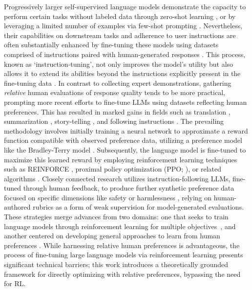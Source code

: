 Progressively larger self-supervised language models demonstrate the capacity to perform certain tasks without labeled data through zero-shot learning \citep{radford2019language}, or by leveraging a limited number of examples via few-shot prompting \citep{gpt3,megatron,chowdhery2022palm}. Nevertheless, their capabilities on downstream tasks and adherence to user instructions are often substantially enhanced by fine-tuning these models using datasets comprised of instructions paired with human-generated responses \citep{mishra-etal-2022-cross,sanh2022multitask,chung2022scaling,thoppilan2022lamda}. This process, known as `instruction-tuning', not only improves the model's utility but also allows it to extend its abilities beyond the instructions explicitly present in the fine-tuning data \citep{chung2022scaling}. In contrast to collecting expert demonstrations, gathering \textit{relative} human evaluations of response quality tends to be more practical, prompting more recent efforts to fine-tune LLMs using datasets reflecting human preferences. This has resulted in marked gains in fields such as translation \citep{kreutzer-etal-2018-reliability}, summarization \citep{stiennon2022learning,ziegler2020finetuning}, story-telling \citep{ziegler2020finetuning}, and following instructions \citep{ouyang2022training,ramamurthy2023is}. The prevailing methodology involves initially training a neural network to approximate a reward function compatible with observed preference data, utilizing a preference model like the Bradley-Terry model \citep{bradley1952rankanalysis}. Subsequently, the language model is fine-tuned to maximize this learned reward by employing reinforcement learning techniques such as REINFORCE \citep{williams1992reinforce}, proximal policy optimization (PPO; \cite{schulman2017proximal}), or related algorithms \citep{ramamurthy2023is}. Closely connected research utilizes instruction-following LLMs, fine-tuned through human feedback, to produce further synthetic preference data focused on specific dimensions like safety or harmlessness \citep{bai2022constitutional}, relying on human-authored rubrics as a form of weak supervision for model-generated evaluations. These strategies merge advances from two domains: one that seeks to train language models through reinforcement learning for multiple objectives~\citep{Ranzato2015SequenceLT,paulus2018a,wu2018learning}, and another centered on developing general approaches to learn from human preferences \citep{christiano2017deep,kupcsik2018learning}. While harnessing relative human preferences is advantageous, the process of fine-tuning large language models via reinforcement learning presents significant technical barriers; this work introduces a theoretically grounded framework for directly optimizing with relative preferences, bypassing the need for RL.

